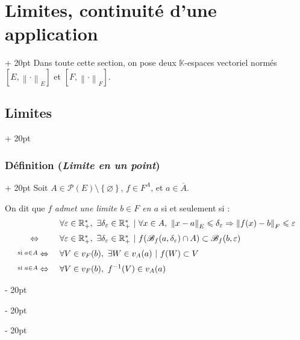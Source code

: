 \documentclass[a4paper, 12pt, twoside]{article}
\newcommand{\R}{\mathbb{R}} %
\newcommand{\K}{\mathbb K}
\newcommand{\cj}[1]{\overline{#1}} %
\newcommand{\lr}[1]{\left( #1 \right)}
\newcommand{\set}[1]{\left\{ #1 \right\}}
\newcommand{\norm}[1]{\left\lVert #1 \right\rVert}
\newcommand{\ssi}{\ \Leftrightarrow \ }
\renewcommand{\le}{\leqslant}
\newcommand{\ind}[1][20pt]{\advance\leftskip + #1}
\newcommand{\deind}[1][20pt]{\advance\leftskip - #1}
\newenvironment{indt}[2][20pt]{#2 \par \ind[#1]}{\par \deind} %
\begin{document}
    \begin{indt}{\section{Limites, continuité d'une application}}
        Dans toute cette section, on pose deux $\K$-espaces vectoriel normés $[E, \norm \cdot _E]$ et $[F, \norm \cdot _F]$.

        \begin{indt}{\subsection{Limites}}
            \begin{indt}{\subsubsection{Définition (\textit{Limite en un point})}}
                Soit $A \in \mathcal P(E) \setminus \set \varnothing$, $f \in F^A$, et $a \in \cj A$.

                On dit que $f$ \emph{admet une limite $b \in F$ en $a$} si et seulement si :
                \[
                    \begin{array}{cl}
                        &
                        \forall \varepsilon \in \R^*_+,\
                        \exists \delta_\varepsilon \in \R^*_+\ |\
                        \forall x \in A,\
                        \norm{x - a}_E \le \delta_\varepsilon \Rightarrow \norm{f(x) - b}_F \le \varepsilon
                        \vspace{6pt}
                        \\
                        \ssi&
                        \forall \varepsilon \in \R^*_+,\
                        \exists \delta_\varepsilon \in \R^*_+\ |\
                        f\!\lr{\mathscr B_f(a, \delta_\varepsilon) \cap A} \subset \mathscr B_f(b, \varepsilon)
                        \vspace{6pt}
                        \\
                        \overset{\text{si } a \in A}\ssi&
                        \forall V \in v_F(b),\ \exists W \in v_A(a)\ |\ f(W) \subset V
                        \vspace{6pt}
                        \\
                        \overset{\text{si } a \in A}\ssi&
                        \forall V \in v_F(b),\ f^{-1}(V) \in v_A(a)
                    \end{array}
                \]


\end{indt}
\end{indt}
\end{indt}
\end{document}
